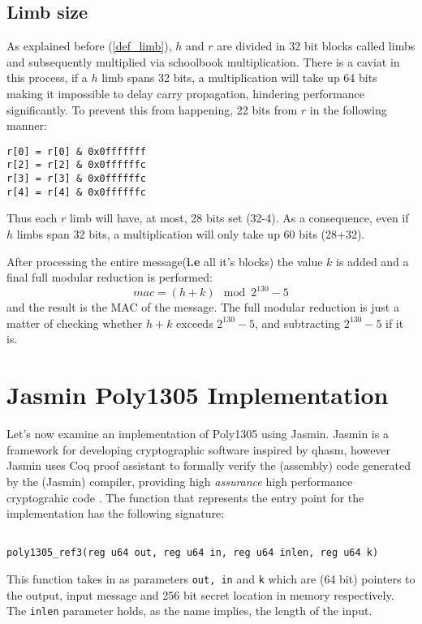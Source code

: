 \documentclass[twocolumn]{article}
\begin{document}
\subsection{Limb size}
As explained before (\ref{def_limb}), $h$ and $r$ are divided in 32 bit blocks called limbs and subsequently multiplied via schoolbook multiplication. There is a caviat
in this process, if a $h$ limb spans 32 bits, a multiplication will take up 64 bits making it impossible to delay carry propagation, hindering performance significantly. 
To prevent this from happening, 22 bits from $r$ in the following manner:
\begin{verbatim}
r[0] = r[0] & 0x0fffffff
r[2] = r[2] & 0x0ffffffc
r[3] = r[3] & 0x0ffffffc
r[4] = r[4] & 0x0ffffffc
\end{verbatim}

Thus each $r$ limb will have, at most, 28 bits set (32-4). As a consequence, even if $h$ limbs span 32 bits, a multiplication will only take up 60 bits (28+32).

After processing the entire message(\textbf{i.e} all it's blocks) the value $k$ is added and a final full modular reduction is performed:
$$mac = (h+k) \mod{2^{130}-5} $$
and the result is the MAC of the message.
\newline
The full modular reduction is just a matter of checking whether $h+k$ exceeds $2^{130}-5$, and subtracting $2^{130}-5$ if it is.

\section{Jasmin Poly1305 Implementation}
Let's now examine an implementation of Poly1305 using Jasmin. Jasmin is a framework for developing cryptographic software inspired by qhasm, however Jasmin uses Coq
proof assistant to formally verify the (assembly) code generated by the (Jasmin) compiler, providing high \textit{assurance} high performance cryptograhic code 
\cite{jasmin_paper}. The function that represents the entry point for the implementation has the following signature: 

\begin{Verbatim}[fontsize=\footnotesize]

poly1305_ref3(reg u64 out, reg u64 in, reg u64 inlen, reg u64 k)

\end{Verbatim}

This function takes in as parameters \texttt{out, in} and \texttt{k} which are (64 bit) pointers to the output, input message and 256 bit secret location in memory 
respectively. The \texttt{inlen} parameter holds, as the name implies, the length of the input.
\end{document}
